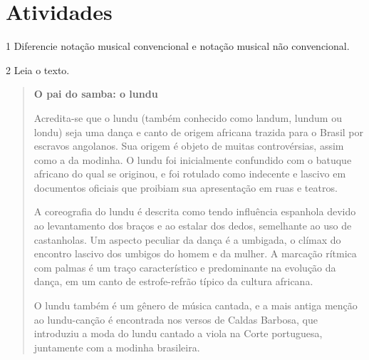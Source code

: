 \section{Atividades}

\num{1} Diferencie notação musical convencional e notação musical não convencional.


\pagebreak
\num{2} Leia o texto.

\begin{quote}
\textbf{O pai do samba: o lundu}

Acredita-se que o lundu (também conhecido como landum, lundum ou londu) seja uma dança e 
canto de origem africana trazida para o Brasil por escravos angolanos. Sua origem é 
objeto de muitas controvérsias, assim como a da modinha. O lundu foi inicialmente 
confundido com o batuque africano do qual se originou, e foi rotulado como indecente e 
lascivo em documentos oficiais que proibiam sua apresentação em ruas e teatros.

A coreografia do lundu é descrita como tendo influência espanhola devido ao levantamento 
dos braços e ao estalar dos dedos, semelhante ao uso de castanholas. Um aspecto peculiar 
da dança é a umbigada, o clímax do encontro lascivo dos umbigos do homem e da mulher. A 
marcação rítmica com palmas é um traço característico e predominante na evolução da 
dança, em um canto de estrofe-refrão típico da cultura africana.

O lundu também é um gênero de música cantada, e a mais antiga menção ao lundu-canção é 
encontrada nos versos de Caldas Barbosa, que introduziu a moda do lundu cantado a viola 
na Corte portuguesa, juntamente com a modinha brasileira.

\end{quote}

